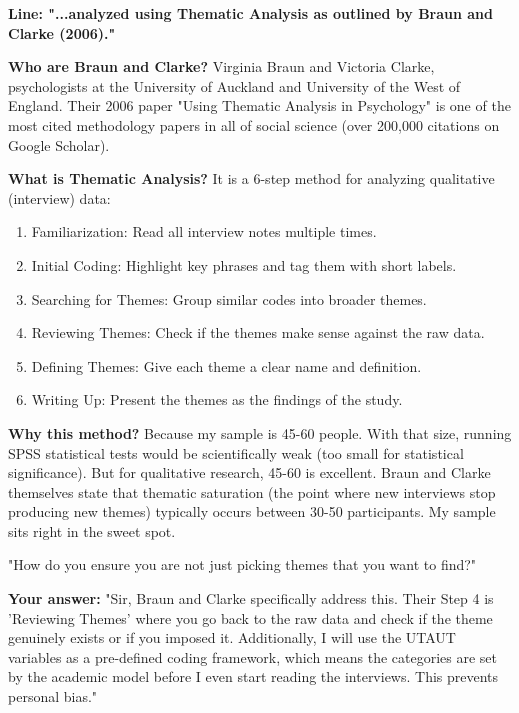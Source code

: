 \documentclass[11pt,a4paper]{article}
\begin{document}
\textbf{Line: "...analyzed using Thematic Analysis as outlined by Braun and Clarke (2006)."}

\begin{abox}
\textbf{Who are Braun and Clarke?} Virginia Braun and Victoria Clarke, psychologists at the University of Auckland and University of the West of England. Their 2006 paper "Using Thematic Analysis in Psychology" is one of the most cited methodology papers in all of social science (over 200,000 citations on Google Scholar).

\textbf{What is Thematic Analysis?} It is a 6-step method for analyzing qualitative (interview) data:
\begin{enumerate}[itemsep=2pt]
    \item Familiarization: Read all interview notes multiple times.
    \item Initial Coding: Highlight key phrases and tag them with short labels.
    \item Searching for Themes: Group similar codes into broader themes.
    \item Reviewing Themes: Check if the themes make sense against the raw data.
    \item Defining Themes: Give each theme a clear name and definition.
    \item Writing Up: Present the themes as the findings of the study.
\end{enumerate}

\textbf{Why this method?} Because my sample is 45-60 people. With that size, running SPSS statistical tests would be scientifically weak (too small for statistical significance). But for qualitative research, 45-60 is excellent. Braun and Clarke themselves state that thematic saturation (the point where new interviews stop producing new themes) typically occurs between 30-50 participants. My sample sits right in the sweet spot.

\begin{qbox}
"How do you ensure you are not just picking themes that you want to find?"
\end{qbox}

\textbf{Your answer:} "Sir, Braun and Clarke specifically address this. Their Step 4 is 'Reviewing Themes' where you go back to the raw data and check if the theme genuinely exists or if you imposed it. Additionally, I will use the UTAUT variables as a pre-defined coding framework, which means the categories are set by the academic model before I even start reading the interviews. This prevents personal bias."
\end{abox}
\end{document}

